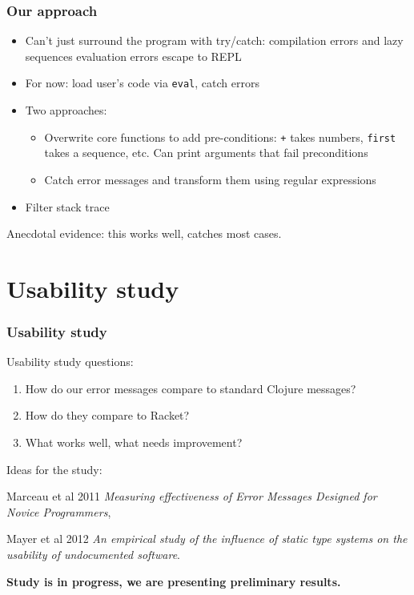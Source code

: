 \documentclass{beamer}
\newcommand{\comment}[1]{{\bf \tt  {#1}}}
\newcommand{\emcomment}[1]{\textcolor{ForestGreen}{\comment{Elena: {#1}}}}
\begin{document}
\begin{frame}
\frametitle{Our approach}
\begin{itemize}
\item Can't just surround the program with try/catch: compilation errors and lazy sequences evaluation errors escape to REPL
\item For now: load user's code via {\tt eval}, catch errors
\item Two approaches:
	\begin{itemize}
	\item Overwrite core functions to add pre-conditions: {\tt +} takes numbers, {\tt first} takes a sequence, etc. Can print 		arguments that fail preconditions
	\item Catch error messages and transform them using regular expressions
	\end{itemize}
\item Filter stack trace
\end{itemize}
Anecdotal evidence: this works well, catches most cases. 
\end{frame}


\section{Usability study}

\begin{frame}
\frametitle{Usability study}
Usability study questions:
\begin{enumerate}
\item How do our error messages compare to standard Clojure messages?
\item How do they compare to Racket? %
\item What works well, what needs improvement? 
\end{enumerate}
Ideas for the study:

Marceau et al 2011 {\it Measuring effectiveness  of Error Messages Designed for Novice Programmers}, 

Mayer et al 2012 {\it  An empirical study of the influence of static
type systems on the usability of undocumented software}. 


{\bf Study is in progress, we are presenting preliminary results.}
\end{frame}
\end{document}

